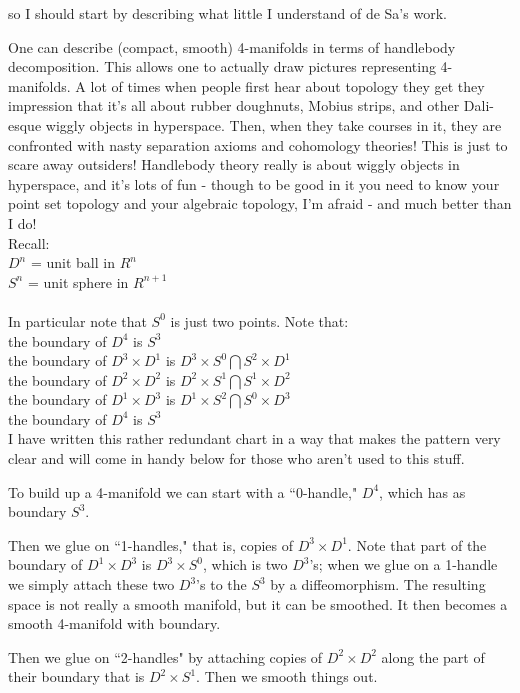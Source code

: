 so I should start by describing what little I understand of de Sa's work.

One can describe (compact, smooth) 4-manifolds in terms of handlebody decomposition. This allows one to actually draw pictures representing 4-manifolds. A lot of times when people first hear about topology they get they impression that it's all about rubber doughnuts, Mobius strips, and other Dali-esque wiggly objects in hyperspace. Then, when they take courses in it, they are confronted with nasty separation axioms and cohomology theories! This is just to scare away outsiders! Handlebody theory really is about wiggly objects in hyperspace, and it's lots of fun - though to be good in it you need to know your point set topology and your algebraic topology, I'm afraid - and much better than I do!
\\
Recall: 
\\
$D^n$ = unit ball in $R^n$\\
$S^n$ = unit sphere in $R^{n+1}$\\
\\
In particular note that $S^0$ is just two points. Note that:
\\
the boundary of $D^4$ is $S^3$\\
the boundary of $D^3 \times D^1$ is $D^3 \times S^0 \bigcap S^2 \times D^1$\\
the boundary of $D^2 \times D^2$ is $D^2 \times S^1 \bigcap S^1 \times D^2$\\
the boundary of $D^1 \times D^3$ is $D^1 \times S^2 \bigcap S^0 \times D^3$\\
the boundary of $D^4$ is $S^3$\\

I have written this rather redundant chart in a way that makes the pattern very clear and will come in handy below for those who aren't used to this stuff.

To build up a 4-manifold we can start with a ``0-handle," $D^4$, which has as boundary $S^3$.

Then we glue on ``1-handles," that is, copies of $D^3 \times D^1$. Note that part of the boundary of $D^1 \times D^3$ is $D^3 \times S^0$, which is two $D^3$'s; when we glue on a 1-handle we simply attach these two $D^3$'s to the $S^3$ by a diffeomorphism. The resulting space is not really a smooth manifold, but it can be smoothed. It then becomes a smooth 4-manifold with boundary.

Then we glue on ``2-handles" by attaching copies of $D^2 \times D^2$ along the part of their boundary that is $D^2 \times S^1$. Then we smooth things out.

